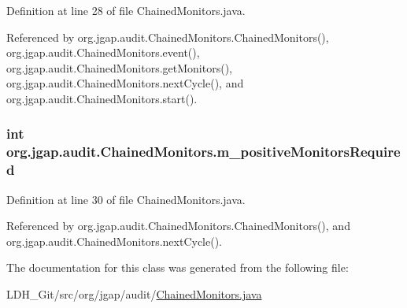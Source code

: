 Definition at line 28 of file Chained\-Monitors.\-java.



Referenced by org.\-jgap.\-audit.\-Chained\-Monitors.\-Chained\-Monitors(), org.\-jgap.\-audit.\-Chained\-Monitors.\-event(), org.\-jgap.\-audit.\-Chained\-Monitors.\-get\-Monitors(), org.\-jgap.\-audit.\-Chained\-Monitors.\-next\-Cycle(), and org.\-jgap.\-audit.\-Chained\-Monitors.\-start().

\hypertarget{classorg_1_1jgap_1_1audit_1_1_chained_monitors_acbdf2715020932454cc3cf90a999d0e2}{
\subsubsection[{m\-\_\-positive\-Monitors\-Required}]{\setlength{\rightskip}{0pt plus 5cm}int org.\-jgap.\-audit.\-Chained\-Monitors.\-m\-\_\-positive\-Monitors\-Required\hspace{0.3cm}{\ttfamily [private]}}}\label{classorg_1_1jgap_1_1audit_1_1_chained_monitors_acbdf2715020932454cc3cf90a999d0e2}


Definition at line 30 of file Chained\-Monitors.\-java.



Referenced by org.\-jgap.\-audit.\-Chained\-Monitors.\-Chained\-Monitors(), and org.\-jgap.\-audit.\-Chained\-Monitors.\-next\-Cycle().



The documentation for this class was generated from the following file\-:\begin{DoxyCompactItemize}
\item 
L\-D\-H\-\_\-\-Git/src/org/jgap/audit/\hyperlink{_chained_monitors_8java}{Chained\-Monitors.\-java}\end{DoxyCompactItemize}
